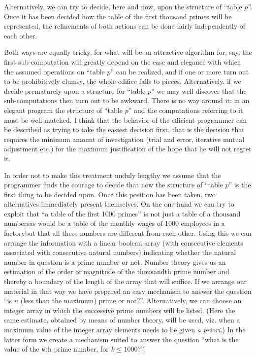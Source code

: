 Alternatively, we can try to decide, here and now, upon the structure of ``table $p$''. Once it has been decided how the table of the first thousand primes will be represented, the refinements of both actions can be done fairly independently of each other.

Both ways are equally tricky, for what will be an attractive algorithm for, say, the first sub-computation will greatly depend on the ease and elegance with which the assumed operations on ``table $p$'' can be realized, and if one or more turn out to be prohibitively clumsy, the whole edifice falls to pieces. Alternatively, if we decide prematurely upon a structure for ``table $p$'' we may well discover that the sub-computations then turn out to be awkward. There is no way around it: in an elegant program the structure of ``table $p$'' and the computations referring to it must be well-matched. I think that the behavior of the efficient programmer can be described as trying to take the easiest decision first, that is the decision that requires the minimum amount of investigation (trial and error, iterative mutual adjustment etc.) for the maximum justification of the hope that he will not regret it.

In order not to make this treatment unduly lengthy we assume that the programmer finds the courage to decide that now the structure of ``table $p$'' is the first thing to be decided upon. Once this position has been taken, two alternatives immediately present themselves. On the one hand we can try to exploit that ``a table of the first 1000 primes'' is not just a table of a thousand numbers\textemdash{}as would be a table of the monthly wages of 1000 employees in a factory\textemdash{}but that all these numbers are different from each other. Using this we can arrange the information with a linear boolean array (with consecutive elements associated with consecutive natural numbers) indicating whether the natural number in question is a prime number or not. Number theory gives us an estimation of the order of magnitude of the thousandth prime number and thereby a boundary of the length of the array that will suffice. If we arrange our material in that way we have prepared an easy mechanism to answer the question ``is $n$ (less than the maximum) prime or not?''. Alternatively, we can choose an integer array in which the successive prime numbers will be listed. (Here the same estimate, obtained by means of number theory, will be used, viz. when a maximum value of the integer array elements needs to be given \textit{a priori}.) In the latter form we create a mechanism suited to answer the question ``what is the value of the $k$th prime number, for $k \leqslant 1000$?''.

